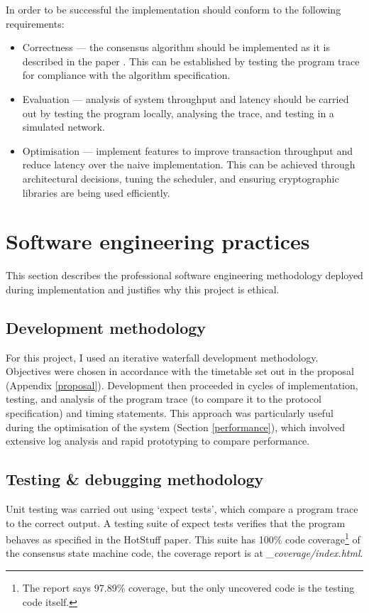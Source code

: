 In order to be successful the implementation should conform to the following requirements:
\begin{itemize}
	\item Correctness --- the consensus algorithm should be implemented as it is described in the paper \cite{yinHotStuffBFTConsensus2019}. This can be established by testing the program trace for compliance with the algorithm specification.
	\item Evaluation --- analysis of system throughput and latency should be carried out by testing the program locally, analysing the trace, and testing in a simulated network.
	\item Optimisation --- implement features to improve transaction throughput and reduce latency over the naive implementation. This can be achieved through architectural decisions, tuning the scheduler, and ensuring cryptographic libraries are being used efficiently.
\end{itemize}

\section{Software engineering practices} \label{softwareeng}

This section describes the professional software engineering methodology deployed during implementation and justifies why this project is ethical.

\subsection{Development methodology} \label{devmethods}

For this project, I used an iterative waterfall development methodology. Objectives were chosen in accordance with the timetable set out in the proposal (Appendix \ref{proposal}). Development then proceeded in cycles of implementation, testing, and analysis of the program trace (to compare it to the protocol specification) and timing statements. This approach was particularly useful during the optimisation of the system (Section \ref{performance}), which involved extensive log analysis and rapid prototyping to compare performance.

\subsection{Testing \& debugging methodology} \label{testing}

Unit testing was carried out using `expect tests', which compare a program trace to the correct output. A testing suite of expect tests verifies that the program behaves as specified in the HotStuff paper. This suite has 100\% code coverage\footnote{The report says 97.89\% coverage, but the only uncovered code is the testing code itself.} of the consensus state machine code, the coverage report is at \textit{\_coverage/index.html}.

